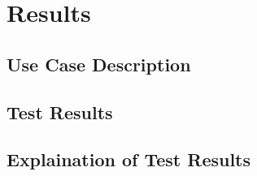 \chapter{Results}
\section{Use Case Description}
\section{Test Results}
\section{Explaination of Test Results}
